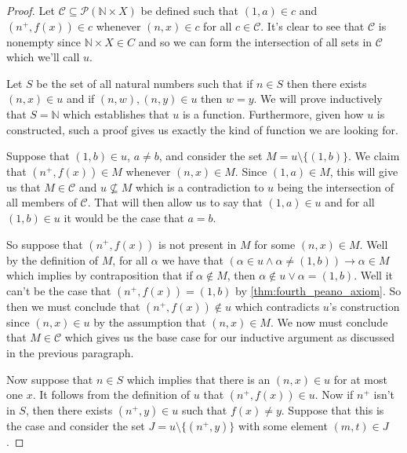 \documentclass{article}
\theoremstyle{definition}
\theoremstyle{definition}
\theoremstyle{plain}
\theoremstyle{remark}
\theoremstyle{plain}
\theoremstyle{remark}
\theoremstyle{plain}
\theoremstyle{plain}
\theoremstyle{plain}
\theoremstyle{plain}
\begin{document}
\begin{proof}
Let \( \mathcal{C} \subseteq \mathcal{P} (\mathbb{N} \times X )\) be defined 
such that \( (1, a) \in c \) and \( (n^{+}, f(x)) \in c \) whenever 
\( ( n, x ) \in c \) for all \( c \in \mathcal{C} \). It's clear to see that 
\( \mathcal{C} \) is nonempty since \( \mathbb{N} \times X \in C \) and so we 
can form the intersection of all sets in \( \mathcal{C} \) which we'll call 
\( u \). 

Let \( S \) be the set of all natural numbers such that if 
\( n \in S \) then there exists \( (n, x) \in u \) and if 
\( (n, w), (n,y) \in u\) then \( w = y \). We will prove inductively that 
\( S = \mathbb{N} \) which establishes that \( u \) is a function. Furthermore, 
given how \( u \) is constructed, such a proof gives us exactly the kind of 
function we are looking for. 

Suppose that \( (1, b) \in u \), \( a \neq b\), and consider the set 
\( M = u \setminus \{ (1,b) \} \).  We claim that \( (n^{+}, f(x)) \in M \) 
whenever \( ( n, x ) \in M \). Since \( (1, a) \in M \), this will give us that 
\( M \in \mathcal{C} \) and 
\( u \not\subseteq M \) which is a contradiction to \( u \) being the 
intersection of all members of \( \mathcal{C} \). That will then allow us to 
say that 
\( (1,a) \in u \) and for all \( (1,b) \in u \) it would be the case that 
\( a = b \). 

So suppose that \( (n^{+}, f(x)) \) is not present in \( M \) for some 
\( (n,x) \in M \). Well by the definition of \( M \), for all \( \alpha \) 
we have that 
\( (\alpha \in u \land \alpha \neq (1,b)) \rightarrow \alpha \in M \) which 
implies by contraposition that if \( \alpha \not\in M \), then 
\( \alpha \not\in u \lor \alpha = (1, b) \). Well  it can't be the case that 
\( (n^{+},f(x)) = (1,b) \) by \autoref{thm:fourth_peano_axiom}. So then we must 
conclude that \( (n^{+}, f(x)) \not\in u \) which 
contradicts \( u \)'s construction since \( (n,x) \in u \) by the 
assumption that \( (n,x) \in M \). We now must conclude that  
\( M \in \mathcal{C} \) which gives us the base case for our inductive argument
as discussed in the previous paragraph.

Now suppose that \( n \in S \) which implies that there is an \( (n,x) \in u \) 
for at most one \( x \). It follows from the definition of \( u \) that 
\( (n^{+}, f(x)) \in u \). Now if \( n^{+} \) isn't in \( S \), then there 
exists \( (n^{+}, y) \in u \) such that \( f(x) \neq y \). Suppose that this 
is the case and consider the set 
\( J = u \setminus \{(n^{+},y)\} \) with some element \( (m, t) \in J \). 


\end{proof}
\end{document}
